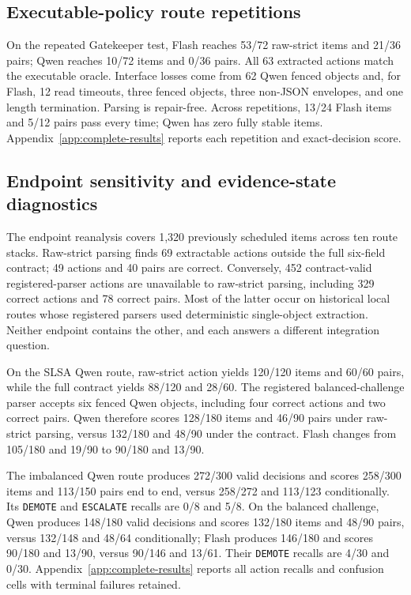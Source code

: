 \documentclass[10pt]{article}
\newcommand{\demote}{\texttt{DEMOTE}}
\newcommand{\escalate}{\texttt{ESCALATE}}
\begin{document}
\subsection{Executable-policy route repetitions}

On the repeated Gatekeeper test, Flash reaches 53/72 raw-strict items and 21/36 pairs; Qwen reaches
10/72 items and 0/36 pairs. All 63 extracted actions match the executable oracle. Interface losses
come from 62 Qwen fenced objects and, for Flash, 12 read timeouts, three fenced objects, three
non-JSON envelopes, and one length termination. Parsing is repair-free. Across repetitions, 13/24
Flash items and 5/12 pairs pass every time; Qwen has zero fully stable items. Appendix~\ref{app:complete-results}
reports each repetition and exact-decision score.

\subsection{Endpoint sensitivity and evidence-state diagnostics}

The endpoint reanalysis covers 1,320 previously scheduled items across ten route stacks.
Raw-strict parsing finds 69 extractable actions outside the full six-field contract; 49 actions and
40 pairs are correct. Conversely, 452 contract-valid registered-parser actions are unavailable to
raw-strict parsing, including 329 correct actions and 78 correct pairs. Most of the latter occur on
historical local routes whose registered parsers used deterministic single-object extraction.
Neither endpoint contains the other, and each answers a different integration question.

On the SLSA Qwen route, raw-strict action yields 120/120 items and 60/60 pairs, while the full
contract yields 88/120 and 28/60. The registered balanced-challenge parser accepts six fenced Qwen
objects, including four correct actions and two correct pairs. Qwen therefore scores 128/180 items
and 46/90 pairs under raw-strict parsing, versus 132/180 and 48/90 under the contract. Flash changes
from 105/180 and 19/90 to 90/180 and 13/90.

The imbalanced Qwen route produces 272/300 valid decisions and scores 258/300 items and 113/150
pairs end to end, versus 258/272 and 113/123 conditionally. Its \demote{} and \escalate{} recalls
are 0/8 and 5/8. On the balanced challenge, Qwen produces 148/180 valid decisions and scores
132/180 items and 48/90 pairs, versus 132/148 and 48/64 conditionally; Flash produces 146/180 and
scores 90/180 and 13/90, versus 90/146 and 13/61. Their \demote{} recalls are 4/30 and 0/30.
Appendix~\ref{app:complete-results} reports all action recalls and confusion cells with terminal
failures retained.
\end{document}
